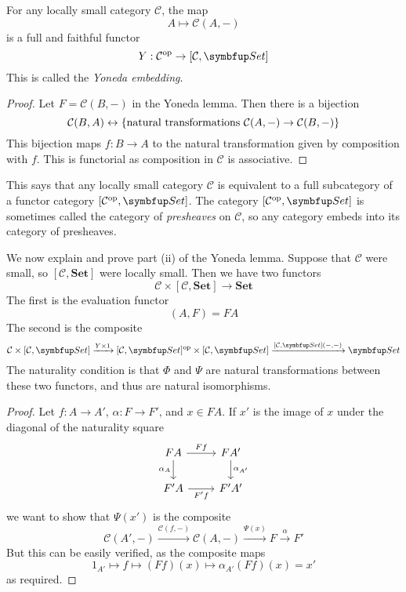 \begin{corollary}
    For any locally small category \( \mathcal C \), the map
    \[ A \mapsto \mathcal C(A, -) \]
    is a full and faithful functor
    \[ Y : \mathcal C^\cop \to [\mathcal C, \mathbf{Set}] \]
    This is called the \emph{Yoneda embedding}.
\end{corollary}
\begin{proof}
    Let \( F = \mathcal C(B, -) \) in the Yoneda lemma.
    Then there is a bijection
    \[ \mathcal C(B, A) \leftrightarrow \qty{\text{natural transformations } \mathcal C(A, -) \to \mathcal C(B, -)} \]
    This bijection maps \( f : B \to A \) to the natural transformation given by composition with \( f \).
    This is functorial as composition in \( \mathcal C \) is associative.
\end{proof}
This says that any locally small category \( \mathcal C \) is equivalent to a full subcategory of a functor category \( [\mathcal C^\cop, \mathbf{Set}] \).
The category \( [\mathcal C^\cop, \mathbf{Set}] \) is sometimes called the category of \emph{presheaves} on \( \mathcal C \), so any category embeds into its category of presheaves.

We now explain and prove part (ii) of the Yoneda lemma.
Suppose that \( \mathcal C \) were small, so \( [\mathcal C, \mathbf{Set}] \) were locally small.
Then we have two functors
\[ \mathcal C \times [\mathcal C, \mathbf{Set}] \to \mathbf{Set} \]
The first is the evaluation functor
\[ (A, F) = FA \]
The second is the composite
\[ \mathcal C \times [\mathcal C, \mathbf{Set}] \xrightarrow{Y \times 1} [\mathcal C, \mathbf{Set}]^\cop \times [\mathcal C, \mathbf{Set}] \xrightarrow{[\mathcal C, \mathbf{Set}](-, -)} \mathbf{Set} \]
The naturality condition is that \( \Phi \) and \( \Psi \) are natural transformations between these two functors, and thus are natural isomorphisms.
\begin{proof}
    Let \( f : A \to A' \), \( \alpha : F \to F' \), and \( x \in F A \).
    If \( x' \) is the image of \( x \) under the diagonal of the naturality square
    \[\begin{tikzcd}
        FA & {FA'} \\
        {F'A} & {F'A'}
        \arrow["Ff", from=1-1, to=1-2]
        \arrow["{\alpha_{A'}}", from=1-2, to=2-2]
        \arrow["{\alpha_A}"', from=1-1, to=2-1]
        \arrow["{F'f}"', from=2-1, to=2-2]
    \end{tikzcd}\]
    we want to show that \( \Psi(x') \) is the composite
    \[ \mathcal C(A', -) \xrightarrow{\mathcal C(f, -)} \mathcal C(A, -) \xrightarrow{\Psi(x)} F \xrightarrow \alpha F' \]
    But this can be easily verified, as the composite maps
    \[ 1_{A'} \mapsto f \mapsto (Ff)(x) \mapsto \alpha_{A'}(Ff)(x) = x' \]
    as required.
\end{proof}

